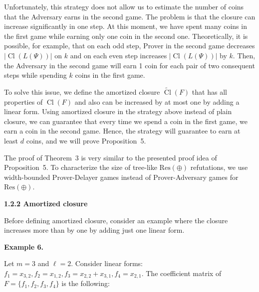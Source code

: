 Unfortunately, this strategy does not allow us to estimate the number of coins that the Adversary earns in the second game. The problem is that the closure can increase significantly in one step. At this moment, we have spent many coins in the first game while earning only one coin in the second one.
Theoretically, it is possible, for example, that on each odd step, Prover in the second game decreases $|\mathop{\mathrm{Cl}}(L(\Psi))|$ on $k$ and on each even step increases $|\mathop{\mathrm{Cl}}(L(\Psi))|$ by $k$. Then, the Adversary in the second game will earn 1 coin for each pair of two consequent steps while spending $k$ coins in the first game.\par



To solve this issue, we define the amortized closure $\widetilde{\mathop{\mathrm{Cl}}}(F)$ that has all properties of $\mathop{\mathrm{Cl}}(F)$ and also can be increased by at most one by adding a linear form. Using amortized closure in the strategy above instead of plain closure, we can guarantee that every time we spend a coin in the first game, we earn a coin in the second game. Hence, the strategy will guarantee to earn at least $d$ coins, and we will prove Proposition 5.\par



The proof of Theorem 3 is very similar to the presented proof idea of Proposition 5. To characterize the size of tree-like $\mathrm{Res}(\oplus)$ refutations, we use width-bounded Prover-Delayer games instead of Prover-Adversary games for $\mathrm{Res}(\oplus)$.\par


\par\medskip\noindent\textbf{
1.2.2 Amortized closure}\par


Before defining amortized closure, consider an example where the closure increases more than by one by adding just one linear form.\par



\par\medskip\noindent\textbf{
Example 6.
}\par



Let $m=3$ and $\ell=2$. Consider linear forms: $f_{1}=x_{3,2},f_{2}=x_{1,2},f_{3}=x_{2,2}+x_{3,1},f_{4}=x_{2,1}$.
The coefficient matrix of $F=\{f_{1},f_{2},f_{3},f_{4}\}$ is the following:\par





